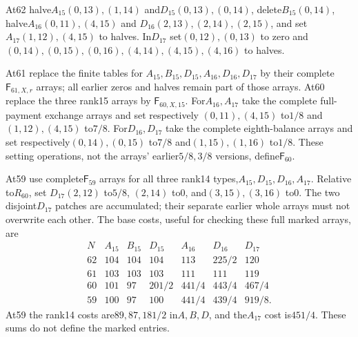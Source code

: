\documentclass[11pt]{article}
\theoremstyle{remark}\newtheorem{remark}[theorem]{Remark}
\begin{document}
At62 halve$A_{15}(0,13),(1,14)$ and$D_{15}(0,13),(0,14)$,
delete$B_{15}(0,14)$, halve$A_{16}(0,11),(4,15)$ and
$D_{16}(2,13),(2,14),(2,15)$, and set
$A_{17}(1,12),(4,15)$ to halves.
In$D_{17}$ set$(0,12),(0,13)$ to zero and
$(0,14),(0,15),(0,16),(4,14),(4,15),(4,16)$ to halves.

At61 replace the finite tables for
$A_{15},B_{15},D_{15},A_{16},D_{16},D_{17}$ by their complete
$\mathsf F_{61,X,r}$ arrays; all earlier zeros and halves remain
part of those arrays. At60 replace the three rank15 arrays by
$\mathsf F_{60,X,15}$. For$A_{16},A_{17}$ take the complete
full-payment exchange arrays and set respectively
$(0,11),(4,15)$ to$1/8$ and$(1,12),(4,15)$ to$7/8$.
For$D_{16},D_{17}$ take the complete eighth-balance arrays and set
respectively$(0,14),(0,15)$ to$7/8$ and$(1,15),(1,16)$ to$1/8$.
These setting operations, not the arrays' earlier$5/8,3/8$
versions, define$\mathsf F_{60}$.

At59 use complete$\mathsf F_{59}$ arrays for all three rank14
types,$A_{15},D_{15},D_{16},A_{17}$. Relative to$R_{60}$, set
$D_{17}(2,12)$ to$5/8$, $(2,14)$ to0, and$(3,15),(3,16)$ to0.
The two disjoint$D_{17}$ patches are accumulated; their separate
earlier whole arrays must not overwrite each other.
The base costs, useful for checking these full marked arrays, are
\[
\begin{array}{c|rrrrrr}
N&A_{15}&B_{15}&D_{15}&A_{16}&D_{16}&D_{17}\\\hline
62&104&104&104&113&225/2&120\\
61&103&103&103&111&111&119\\
60&101&97&201/2&441/4&443/4&467/4\\
59&100&97&100&441/4&439/4&919/8 .
\end{array}
\]
At59 the rank14 costs are$89,87,181/2$ in$A,B,D$, and the$A_{17}$
cost is$451/4$. These sums do not define the marked entries.
\end{document}
